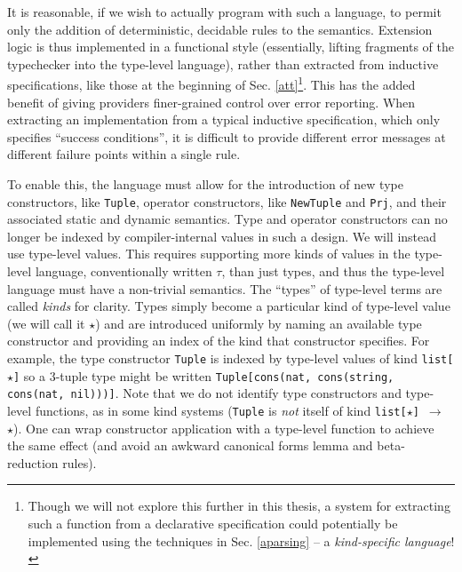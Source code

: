 It is reasonable, if we wish to actually program with such a language, to permit only the addition of deterministic, decidable rules to the semantics. Extension logic is thus implemented in a functional style  (essentially, lifting fragments of the typechecker into the type-level language), rather than extracted from inductive specifications, like those at the beginning of Sec. \ref{att}\footnote{Though we will not explore this further in this thesis, a system for extracting such a function from a declarative specification could potentially be implemented using the techniques in Sec. \ref{aparsing} -- a \emph{kind-specific language}!}. This has the added benefit of giving providers finer-grained control over error reporting. When extracting an implementation from a typical inductive specification, which only specifies ``success conditions'', it is difficult to provide different error messages at different failure points within a single rule.

To enable this, the language must allow for the introduction of new type constructors, like \verb|Tuple|, operator constructors, like \verb|NewTuple| and \verb|Prj|, and their associated static and dynamic semantics. Type and operator constructors can no longer be indexed by compiler-internal values in such a design. 
We will instead use type-level values. This requires supporting more kinds of values in the type-level language, conventionally written $\tau$, than just types, and thus the type-level language must have a non-trivial semantics. The ``types'' of type-level terms are called \emph{kinds} for clarity. Types simply become a particular kind of type-level value (we will call it $\star$) and are introduced uniformly by naming an available type constructor and providing an index of the kind that constructor specifies. For example, the type constructor \verb|Tuple| is indexed by type-level values of kind \verb|list[|$\star$\verb|]| so a 3-tuple type might be written \verb|Tuple[cons(nat, cons(string, cons(nat, nil)))]|. Note that we do not identify type constructors and type-level functions, as in some kind systems (\verb|Tuple| is \emph{not} itself of kind \verb|list[|$\star$\verb|] |$\rightarrow$\verb| |$\star$). One can wrap constructor application with a type-level function to achieve the same effect (and avoid an awkward canonical forms lemma and beta-reduction rules).

